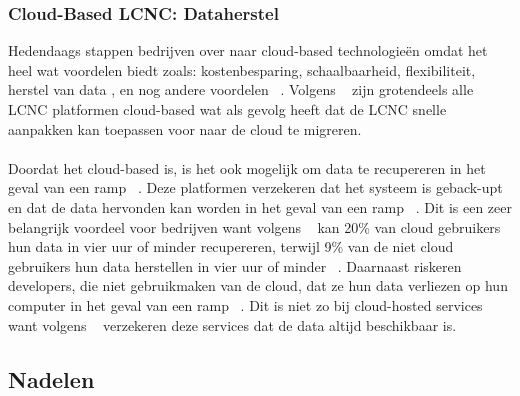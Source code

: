 \subsubsection{Cloud-Based LCNC: Dataherstel}
\label{subsec:cloud-based-lcnc}
Hedendaags stappen bedrijven over naar cloud-based technologieën omdat het heel wat voordelen biedt zoals: 
kostenbesparing, schaalbaarheid, flexibiliteit, herstel van data , en nog andere voordelen ~\autocite{Sufi_2023}. 
Volgens ~\textcites{Sufi_2023} zijn grotendeels alle LCNC platformen cloud-based wat als gevolg heeft dat de LCNC snelle aanpakken kan toepassen voor naar de cloud te migreren.
\\
\\
Doordat het cloud-based is, is het ook mogelijk om data te recupereren in het geval van een ramp ~\autocite{Sufi_2023}. 
Deze platformen verzekeren dat het systeem is geback-upt en dat de data hervonden kan worden in het geval van een ramp ~\autocite{Sufi_2023}. 
Dit is een zeer belangrijk voordeel voor bedrijven want volgens ~\textcite{Sufi_2023} kan 20\% van cloud gebruikers hun data in vier uur of minder recupereren, 
terwijl 9\% van de niet cloud gebruikers hun data herstellen in vier uur of minder ~\autocite{Sufi_2023}. Daarnaast riskeren developers, die niet gebruikmaken van de cloud, 
dat ze hun data verliezen op hun computer in het geval van een ramp ~\autocite{Sufi_2023}. 
Dit is niet zo bij cloud-hosted services want volgens ~\textcite{Sufi_2023} verzekeren deze services dat de data altijd beschikbaar is.
\subsection{Nadelen}%
\label{subsec:nadelen}
